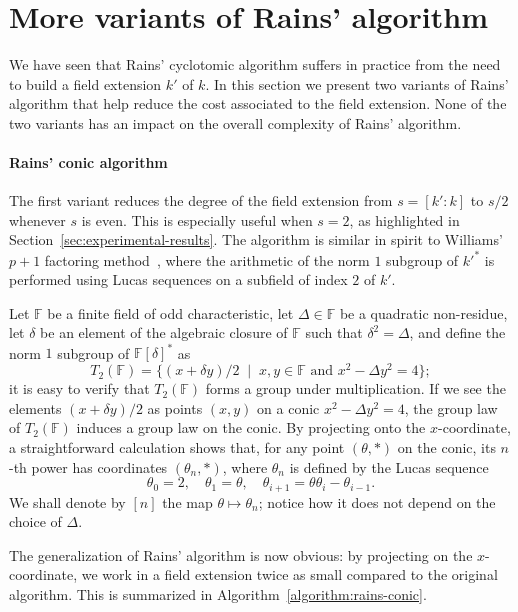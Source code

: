 \documentclass[12pt]{article}
\theoremstyle{plain}
\theoremstyle{definition}
\def\F{\ensuremath{\mathbb{F}}}
\newcounter{algorithm}
\begin{document}

\section{More variants of Rains' algorithm}
\label{app:rains-vars}

We have seen that Rains' cyclotomic algorithm suffers in practice from
the need to build a field extension $k'$ of $k$. %
In this section we present two variants of Rains' algorithm that help
reduce the cost associated to the field extension. %
None of the two variants has an impact on the overall complexity of
Rains' algorithm.

\paragraph{Rains' conic algorithm}
The first variant reduces the degree of the field extension from
$s=[k':k]$ to $s/2$ whenever $s$ is even. %
This is especially useful when $s=2$, as highlighted in
Section~\ref{sec:experimental-results}. %
The algorithm is similar in spirit to Williams' $p+1$ factoring
method~\cite{williams1982}, where the arithmetic of the norm $1$
subgroup of ${k'}^*$ is performed using Lucas sequences on a subfield
of index $2$ of $k'$.

Let $\F$ be a finite field of odd characteristic, let $\Delta\in\F$ be
a quadratic non-residue, let $\delta$ be an element of the algebraic
closure of $\F$ such that $\delta^2=\Delta$, and define the norm $1$
subgroup of $\F[\delta]^*$ as
\[T_2(\F) = \{(x+\delta y)/2 \;\mid\; x,y\in\F \text{ and } x^2-\Delta
  y^2 = 4\};\] %
it is easy to verify that $T_2(\F)$ forms a group under
multiplication. %
If we see the elements $(x+\delta y)/2$ as points $(x,y)$ on a conic
$x^2-\Delta y^2=4$, the group law of $T_2(\F)$ induces a group law on
the conic. %
By projecting onto the $x$-coordinate, a straightforward calculation
shows that, for any point $(\theta,*)$ on the conic, its $n$-th power
has coordinates $(\theta_n,*)$, where $\theta_n$ is defined by the
Lucas sequence
\[\theta_0 = 2, \quad \theta_1 = \theta, \quad \theta_{i+1}=\theta\theta_i-\theta_{i-1}.\] %
We shall denote by $[n]$ the map $\theta\mapsto\theta_n$; notice how
it does not depend on the choice of $\Delta$.

The generalization of Rains' algorithm is now obvious: by projecting
on the $x$-coordinate, we work in a field extension twice as small
compared to the original algorithm. %
This is summarized in Algorithm~\ref{algorithm:rains-conic}.
\end{document}
